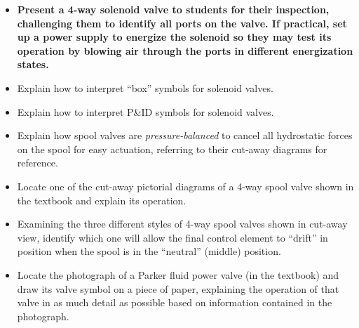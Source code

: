 \begin{itemize}
\item{} {\bf Present a 4-way solenoid valve to students for their inspection, challenging them to identify all ports on the valve.  If practical, set up a power supply to energize the solenoid so they may test its operation by blowing air through the ports in different energization states.}
\item{} Explain how to interpret ``box'' symbols for solenoid valves.
\item{} Explain how to interpret P\&ID symbols for solenoid valves.
\item{} Explain how spool valves are {\it pressure-balanced} to cancel all hydrostatic forces on the spool for easy actuation, referring to their cut-away diagrams for reference.
\item{} Locate one of the cut-away pictorial diagrams of a 4-way spool valve shown in the textbook and explain its operation.
\item{} Examining the three different styles of 4-way spool valves shown in cut-away view, identify which one will allow the final control element to ``drift'' in position when the spool is in the ``neutral'' (middle) position.
\item{} Locate the photograph of a Parker fluid power valve (in the textbook) and draw its valve symbol on a piece of paper, explaining the operation of that valve in as much detail as possible based on information contained in the photograph.
\end{itemize}





